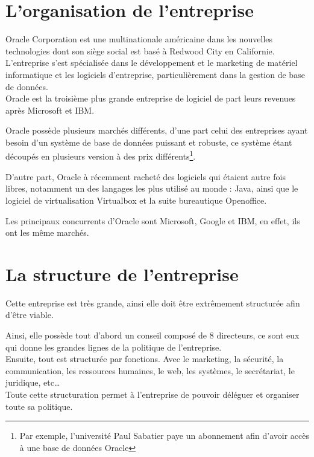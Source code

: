 \documentclass{article}
\begin{document}
	\maketitle
	\setcounter{secnumdepth}{2}
	\section{L'organisation de l'entreprise}
	Oracle Corporation est une multinationale américaine dans les nouvelles technologies dont son siège social est basé à Redwood
	City en Californie. L'entreprise s'est spécialisée dans le développement et le marketing de matériel informatique et les
	logiciels d'entreprise, particulièrement dans la gestion de base de données. \\
	Oracle est la troisième plus grande entreprise de logiciel de part leurs revenues après Microsoft et IBM.

	Oracle possède plusieurs marchés différents, d'une part celui des entreprises ayant besoin d'un système de base de données
	puissant et robuste, ce système étant découpés en plusieurs version à des prix différents\footnote{Par exemple, l'université Paul
	Sabatier paye un abonnement afin d'avoir accès à une base de données Oracle}.

	D'autre part, Oracle à récemment racheté des logiciels qui étaient autre fois libres, notamment un des langages les plus utilisé
	au monde : Java, ainsi que le logiciel de virtualisation Virtualbox et la suite bureautique Openoffice.

	Les principaux concurrents d'Oracle sont Microsoft, Google et IBM, en effet, ils ont les même marchés.

	\section{La structure de l'entreprise}\label{struct}
	Cette entreprise est très grande, ainsi elle doit être extrêmement structurée afin d'être viable.

	Ainsi, elle possède tout d'abord un conseil composé de 8 directeurs, ce sont eux qui donne les grandes lignes de la politique de
	l'entreprise.
	\\Ensuite, tout est structurée par fonctions. Avec le marketing, la sécurité, la communication, les ressources humaines, le web,
	les systèmes, le secrétariat, le juridique, etc\ldots\\
	Toute cette structuration permet à l'entreprise de pouvoir déléguer et organiser toute sa politique.
\end{document}
